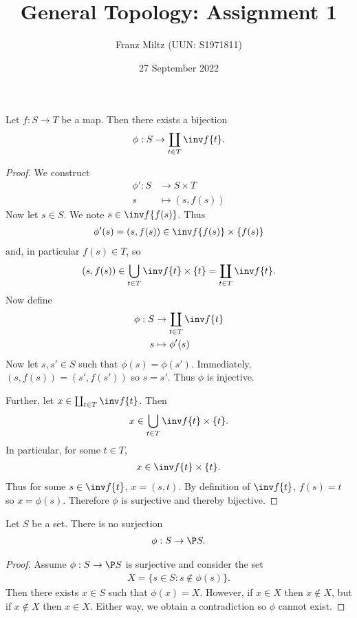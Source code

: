 \documentclass{article}
\begin{document}
\title{General Topology: Assignment 1}
\author{Franz Miltz (UUN: S1971811)}
\date{27 September 2022}
\maketitle

\begin{claim*}[1]
  Let $f:S\to T$ be a map. Then there exists a bijection
  \begin{align*}
    \phi : S \to \coprod_{t\in T} \inv f \{t\}.
  \end{align*}
  \begin{proof}
    We construct
    \begin{align*}
      \phi' : S & \to S \times T \\
      s & \mapsto (s, f(s))
    \end{align*}
    Now let $s\in S$. We note $s\in \inv f\{f(s)\}$. Thus
    \begin{align*}
      \phi'(s)=(s,f(s))\in \inv f\{f(s)\}\times \{f(s)\}
    \end{align*}
    and, in particular $f(s)\in T$, so
    \begin{align*}
      (s,f(s))\in \bigcup_{t\in T} \inv f \{t\}\times \{t\} = \coprod_{t\in T} \inv f \{t\}.
    \end{align*}
    Now define
    \begin{align*}
      \phi : S & \to \coprod_{t\in T} \inv f \{t\} \\
      s & \mapsto \phi'(s)
    \end{align*}
    Now let $s,s'\in S$ such that $\phi(s)=\phi(s')$. Immediately,
    $(s,f(s))=(s',f(s'))$ so $s=s'$. Thus $\phi$ is injective.

    Further, let $x\in \coprod_{t\in T} \inv f\{t\}$. Then
    \begin{align*}
      x \in \bigcup_{t\in T} \inv f \{t\} \times \{t\}.
    \end{align*}
    In particular, for some $t\in T$,
    \begin{align*}
      x\in \inv f\{t\} \times \{t\}.
    \end{align*}
    Thus for some $s\in \inv f\{t\}$, $x=(s,t)$. By definition of $\inv f\{t\}$,
    $f(s)=t$ so $x=\phi(s)$. Therefore $\phi$ is surjective and thereby bijective.
  \end{proof}
\end{claim*}

\begin{claim*}[2]
  Let $S$ be a set. There is no surjection
  \begin{align*}
    \phi : S \to \P S.
  \end{align*}
  \begin{proof}
    Assume $\phi:S\to \P S$ is surjective and consider the set
    \begin{align*}
      X = \{ s\in S : s \not\in \phi(s)\}.
    \end{align*}
    Then there exists $x\in S$ such that $\phi(x) = X$. However, if $x\in X$ then
    $x\not\in X$, but if $x\not\in X$ then $x\in X$. Either way, we obtain a contradiction
    so $\phi$ cannot exist.
  \end{proof}
\end{claim*}
\end{document}
